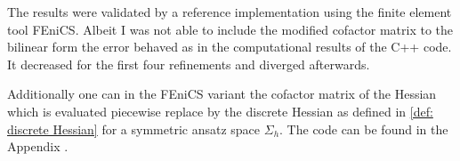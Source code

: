 The results were validated by a reference implementation using the finite element tool FEniCS. Albeit I was not able to include the modified cofactor matrix to the bilinear form the error behaved as in the computational results of the C++ code. It decreased for the first four refinements and diverged afterwards. 

Additionally one can in the FEniCS variant the cofactor matrix of the Hessian which is evaluated piecewise replace by the discrete Hessian as defined in \ref{def: discrete Hessian} for a symmetric ansatz space $\Sigma_h$. The code can be found in the Appendix .